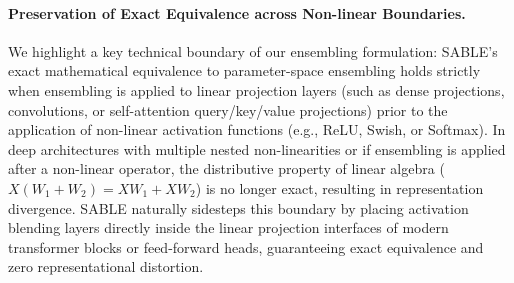 \paragraph{Preservation of Exact Equivalence across Non-linear Boundaries.} We highlight a key technical boundary of our ensembling formulation: SABLE's exact mathematical equivalence to parameter-space ensembling holds strictly when ensembling is applied to linear projection layers (such as dense projections, convolutions, or self-attention query/key/value projections) prior to the application of non-linear activation functions (e.g., ReLU, Swish, or Softmax). In deep architectures with multiple nested non-linearities or if ensembling is applied after a non-linear operator, the distributive property of linear algebra ($X(W_1 + W_2) = X W_1 + X W_2$) is no longer exact, resulting in representation divergence. SABLE naturally sidesteps this boundary by placing activation blending layers directly inside the linear projection interfaces of modern transformer blocks or feed-forward heads, guaranteeing exact equivalence and zero representational distortion.
